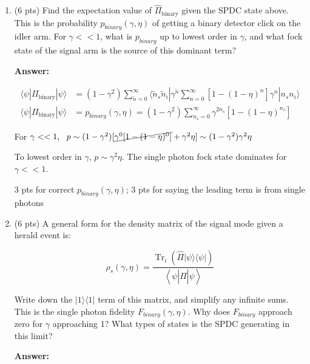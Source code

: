 \documentclass[12pt]{caltech_thesis}
\begin{document}
\begin{enumerate}
\def\labelenumi{\arabic{enumi}.}
\item
  (6 pts) Find the expectation value of \(\hat{\Pi}_{\text {binary}}\)
  given the SPDC state above. This is the probability
  \(p_{binary}\left(\gamma, \eta\right)\) of getting a binary detector
  click on the idler arm. For \(\gamma << 1\), what is \(p_{binary}\) up
  to lowest order in \(\gamma\), and what fock state of the signal arm
  is the source of this dominant term?

  {\color{midnightblue}  \textbf{Answer:} }

  {\color{midnightblue} 

  \[\begin{aligned}
   \langle \psi | \Pi_{\text {binary}} | \psi \rangle &= (1- \gamma^2) \sum_{\tilde{n}=0}^{\infty} \langle \tilde{n}_s \tilde{n}_i | \gamma^{\tilde{n}} \sum_{n=0}^{\infty}[1 - (1-\eta)^{n}] \gamma^n | n_s n_i \rangle \\
   \langle \psi | \Pi_{\text {binary}} | \psi \rangle &= p_{binary}(\gamma, \eta) =  \boxed{(1-\gamma^2) \sum_{n_s=0}^{\infty} \gamma^{2n_s} [1 - (1 - \eta)^{n_s}]}
   \end{aligned}\]

  }

  {\color{midnightblue} For
  \(\gamma << 1, ~~ p \sim (1 - \gamma^2)[\cancel{\gamma^0[1 - (1 - \eta)^0]} + \gamma^{2}\eta ] \sim (1 - \gamma^2)\gamma^{2}\eta\)
  }

  {\color{midnightblue}  To lowest order in \(\gamma\),
  \(p \sim \gamma^{2}\eta\). The single photon fock state dominates for
  \(\gamma << 1\). }

  {\color{darkred}  3 pts for correct \(p_{binary}(\gamma, \eta)\); 3
  pts for saying the leading term is from single photons }
\item
  (6 pts) A general form for the density matrix of the signal mode given
  a herald event is:

  \[\rho_{s}\left(\gamma, \eta\right)=\frac{\operatorname{Tr}_{i}\left(\hat{\Pi}|\psi\rangle\langle\psi|\right)}{\left\langle\psi\left|\hat{\Pi}\right| \psi\right\rangle}\]

  Write down the \(|1\rangle\langle1|\) term of this matrix, and
  simplify any infinite sums. This is the single photon fidelity
  \(F_{binary}(\gamma, \eta)\). Why does \(F_{binary}\) approach zero
  for \(\gamma\) approaching 1? What types of states is the SPDC
  generating in this limit?

  {\color{midnightblue}  \textbf{Answer:} }


\end{enumerate}
\end{document}
